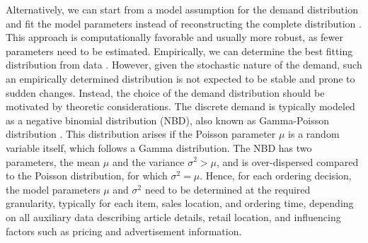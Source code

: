 \documentclass[BCOR=1mm, DIV=calc,10pt,
twoside=true,
twocolumn,
headings=normal]{scrartcl}
\begin{document}
Alternatively, we can start from a model assumption for the demand distribution and fit the model parameters instead of reconstructing the complete distribution \cite{astonpr373, SALINAS20201181}. This approach is computationally favorable and usually more robust, as fewer parameters need to be estimated. Empirically, we can determine the best fitting distribution from data \cite{adan1995}. However, given the stochastic nature of the demand, such an empirically determined distribution is not expected to be stable and prone to sudden changes. Instead, the choice of the demand distribution should be motivated by theoretic considerations. The discrete demand is typically modeled as a negative binomial distribution (NBD), also known as Gamma-Poisson distribution \cite{Ehrenberg1959, Ehrenberg1967, Ehrenberg1972, Chatfield1973, Schmittlein_1985}. This distribution arises if the Poisson parameter $\mu$ is a random variable itself, which follows a Gamma distribution. The NBD has two parameters, the mean $\mu$ and the variance $ \sigma^2 > \mu$, and is over-dispersed compared to the Poisson distribution, for which $\sigma^2 = \mu$. Hence, for each ordering decision, the model parameters $\mu$ and $\sigma^2$ need to be determined at the required granularity, typically for each item, sales location, and ordering time, depending on all auxiliary data describing article details, retail location, and influencing factors such as pricing and advertisement information.
\end{document}
